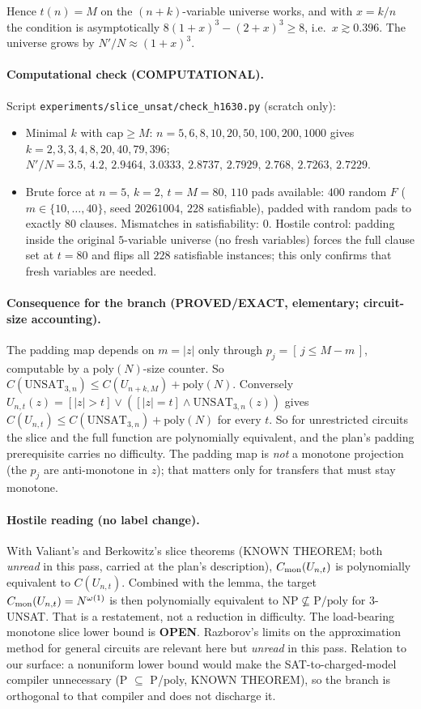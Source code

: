 \documentclass[11pt]{article}
\begin{document}
Hence $t(n)=M$ on the $(n+k)$-variable universe works, and with $x=k/n$ the condition is asymptotically
$8(1+x)^3-(2+x)^3\ge 8$, i.e.\ $x\gtrsim0.396$. The universe grows by $N'/N\approx(1+x)^3$.

\paragraph{Computational check (COMPUTATIONAL).} Script \texttt{experiments/slice\_unsat/check\_h1630.py} (scratch only):
\begin{itemize}
\item Minimal $k$ with $\mathrm{cap}\ge M$: $n=5,6,8,10,20,50,100,200,1000$ gives
$k=2,3,3,4,8,20,40,79,396$; $N'/N=3.5,\,4.2,\,2.9464,\,3.0333,\,2.8737,\,2.7929,\,2.768,\,2.7263,\,2.7229$.
\item Brute force at $n=5$, $k=2$, $t=M=80$, $110$ pads available: $400$ random $F$ ($m\in\{10,\dots,40\}$,
seed $20261004$, $228$ satisfiable), padded with random pads to exactly $80$ clauses. Mismatches in satisfiability: $0$.
Hostile control: padding inside the original $5$-variable universe (no fresh variables) forces the full clause set
at $t=80$ and flips all $228$ satisfiable instances; this only confirms that fresh variables are needed.
\end{itemize}

\paragraph{Consequence for the branch (PROVED/EXACT, elementary; circuit-size accounting).}
The padding map depends on $m=|z|$ only through $p_j=[\,j\le M-m\,]$, computable by a poly$(N)$-size counter. So
$C(\mathrm{UNSAT}_{3,n})\le C(U_{n+k,M})+\mathrm{poly}(N)$. Conversely
$U_{n,t}(z)=[|z|>t]\vee([|z|=t]\wedge\mathrm{UNSAT}_{3,n}(z))$ gives $C(U_{n,t})\le C(\mathrm{UNSAT}_{3,n})+\mathrm{poly}(N)$
for every $t$. So for unrestricted circuits the slice and the full function are polynomially equivalent, and the
plan's padding prerequisite carries no difficulty. The padding map is \emph{not} a monotone projection (the $p_j$
are anti-monotone in $z$); that matters only for transfers that must stay monotone.

\paragraph{Hostile reading (no label change).} With Valiant's and Berkowitz's slice theorems (KNOWN THEOREM; both
\emph{unread} in this pass, carried at the plan's description), $C_{\rm mon}(U_{n,t})$ is polynomially equivalent to
$C(U_{n,t})$. Combined with the lemma, the target $C_{\rm mon}(U_{n,t})=N^{\omega(1)}$ is then polynomially equivalent to
$\mathrm{NP}\not\subseteq\mathrm{P/poly}$ for 3-UNSAT. That is a restatement, not a reduction in difficulty. The
load-bearing monotone slice lower bound is \textbf{OPEN}. Razborov's limits on the approximation method for general
circuits are relevant here but \emph{unread} in this pass. Relation to our surface: a nonuniform lower bound would make the
SAT-to-charged-model compiler unnecessary (P $\subseteq$ P/poly, KNOWN THEOREM), so the branch is orthogonal to that
compiler and does not discharge it.
\end{document}
